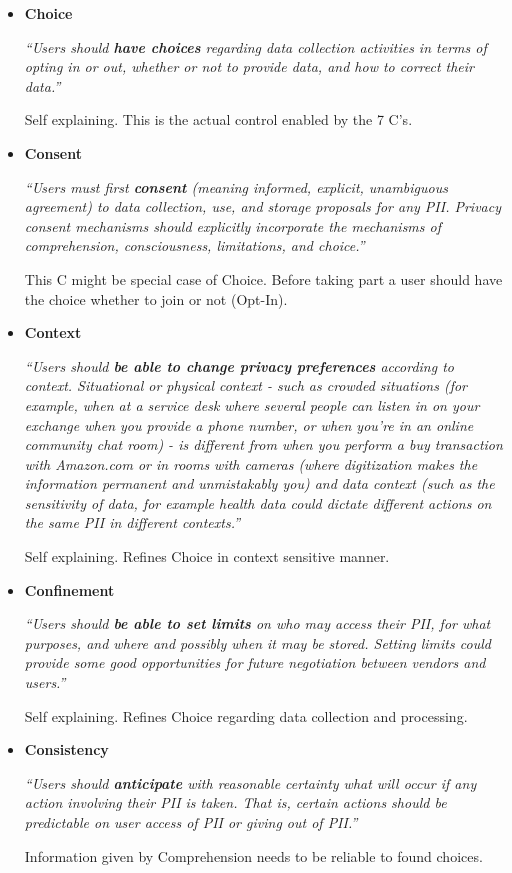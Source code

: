 \begin{itemize}
\item
\textbf{Choice}

\emph{``Users should \textbf{have choices} regarding data collection
activities in terms of opting in or out, whether or not to provide data,
and how to correct their data.''}

Self explaining. This is the actual control enabled by the 7 C's.

\item
\textbf{Consent}

\emph{``Users must first \textbf{consent} (meaning informed, explicit,
unambiguous agreement) to data collection, use, and storage proposals
for any PII. Privacy consent mechanisms should explicitly incorporate
the mechanisms of comprehension, consciousness, limitations, and
choice.''}

This C might be special case of Choice. Before taking part a user should
have the choice whether to join or not (Opt-In).

\item
\textbf{Context}

\emph{``Users should \textbf{be able to change privacy preferences}
according to context. Situational or physical context - such as crowded
situations (for example, when at a service desk where several people
can listen in on your exchange when you provide a phone number, or when
you're in an online community chat room) - is different from when you
perform a buy transaction with Amazon.com or in rooms with cameras
(where digitization makes the information permanent and unmistakably
you) and data context (such as the sensitivity of data, for example
health data could dictate different actions on the same PII in different
contexts.''}

Self explaining. Refines Choice in context sensitive manner.

\item
\textbf{Confinement}

\emph{``Users should \textbf{be able to set limits} on who may access
their PII, for what purposes, and where and possibly when it may be
stored. Setting limits could provide some good opportunities for future
negotiation between vendors and users.''}

Self explaining. Refines Choice regarding data collection and
processing.

\item
\textbf{Consistency}

\emph{``Users should \textbf{anticipate} with reasonable certainty what
will occur if any action involving their PII is taken. That is, certain
actions should be predictable on user access of PII or giving out of
PII.''}

Information given by Comprehension needs to be reliable to found
choices.



\end{itemize}



